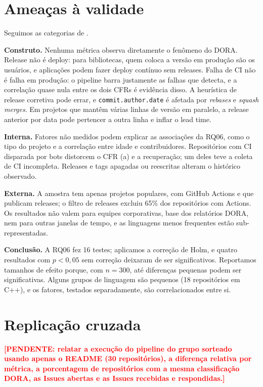 \documentclass[12pt]{article}
\newcommand{\pendente}[1]{\textcolor{red}{\textbf{[PENDENTE: #1]}}}
\begin{document}
\section{Ameaças à validade}

Seguimos as categorias de \cite{wohlin2012}.

\textbf{Construto.} Nenhuma métrica observa diretamente o fenômeno do DORA. Release
não é deploy: para bibliotecas, quem coloca a versão em produção são os usuários, e
aplicações podem fazer deploy contínuo sem releases. Falha de CI não é falha em
produção: o pipeline barra justamente as falhas que detecta, e a correlação quase nula
entre os dois CFRs é evidência disso. A heurística de release corretiva pode errar, e
\texttt{commit.author.date} é afetada por \textit{rebases} e \textit{squash merges}.
Em projetos que mantêm várias linhas de versão em paralelo, a release anterior por
data pode pertencer a outra linha e inflar o lead time.

\textbf{Interna.} Fatores não medidos podem explicar as associações da RQ06, como o
tipo do projeto e a correlação entre idade e contribuidores. Repositórios com CI
disparada por bots distorcem o CFR (a) e a recuperação; um deles teve a coleta de CI
incompleta. Releases e tags apagadas ou reescritas alteram o histórico observado.

\textbf{Externa.} A amostra tem apenas projetos populares, com GitHub Actions e que
publicam releases; o filtro de releases excluiu 65\% dos repositórios com Actions. Os
resultados não valem para equipes corporativas, base dos relatórios DORA, nem para
outras janelas de tempo, e as linguagens menos frequentes estão sub-representadas.

\textbf{Conclusão.} A RQ06 fez 16 testes; aplicamos a correção de Holm, e quatro
resultados com $p < 0{,}05$ sem correção deixaram de ser significativos. Reportamos
tamanhos de efeito porque, com $n = 300$, até diferenças pequenas podem ser
significativas. Alguns grupos de linguagem são pequenos (18 repositórios em C++), e os
fatores, testados separadamente, são correlacionados entre si.

\section{Replicação cruzada}

\pendente{relatar a execução do pipeline do grupo sorteado usando apenas o README
(30 repositórios), a diferença relativa por métrica, a porcentagem de repositórios com
a mesma classificação DORA, as Issues abertas e as Issues recebidas e respondidas.}
\end{document}
